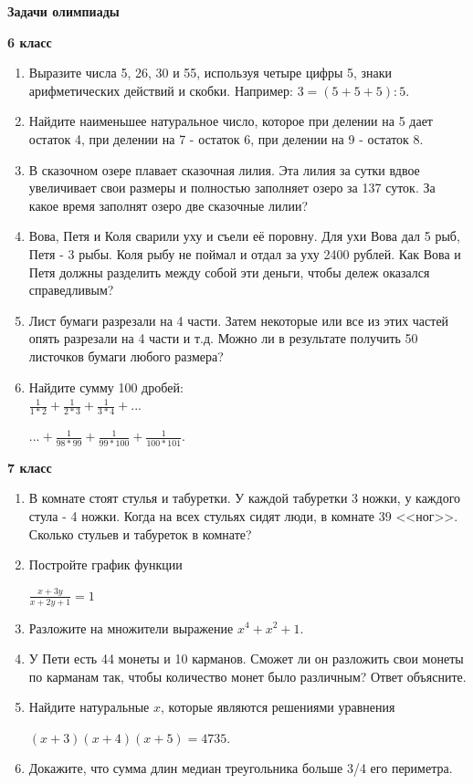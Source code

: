 \documentclass[a4paper,9pt]{article}
\begin{document}
\begin{center}
    {\LARGE \textbf{Задачи олимпиады}}
\end{center}

\begin{multicols}{3}

\textbf{6 класс}

\begin{enumerate}
    \item Выразите числа 5, 26, 30 и 55, используя четыре цифры 5, знаки арифметических действий и скобки. Например: \(3=(5+5+5):5\).
    \item Найдите наименьшее натуральное число, которое при делении на 5 дает остаток 4, при делении на 7 - остаток 6, при делении на 9 - остаток 8.
    \item В сказочном озере плавает сказочная лилия. Эта лилия за сутки вдвое увеличивает свои размеры и полностью заполняет озеро за 137 суток. За какое время заполнят озеро две сказочные лилии?
    \item Вова, Петя и Коля сварили уху и съели её поровну. Для ухи Вова дал 5 рыб, Петя - 3 рыбы. Коля рыбу не поймал и отдал за уху 2400 рублей. Как Вова и Петя должны разделить между собой эти деньги, чтобы дележ оказался справедливым?
    \item Лист бумаги разрезали на 4 части. Затем некоторые или все из этих частей опять разрезали на 4 части и т.д. Можно ли в результате получить 50 листочков бумаги любого размера?
    \item Найдите сумму 100 дробей: \\[0.5em]
    \(\frac{1}{1*2}+\frac{1}{2*3}+\frac{1}{3*4}+...\)
    \begin{center}
        \(...+\frac{1}{98*99}+\frac{1}{99*100}+\frac{1}{100*101}\).
    \end{center}
\end{enumerate}

\textbf{7 класс}

\begin{enumerate}
    \item В комнате стоят стулья и табуретки. У каждой табуретки 3 ножки, у каждого стула - 4 ножки. Когда на всех стульях сидят люди, в комнате 39 <<ног>>. Сколько стульев и табуреток в комнате?
    \item Постройте график функции
    \begin{center}
        \(\frac{x+3y}{x+2y+1}=1\)
    \end{center}
    \item Разложите на множители выражение \(x^4+x^2+1\).
    \item У Пети есть 44 монеты и 10 карманов. Сможет ли он разложить свои монеты по карманам так, чтобы количество монет было различным? Ответ объясните.
    \item Найдите натуральные \(x\), которые являются решениями уравнения
    \begin{center}
        \((x+3)(x+4)(x+5)=4735\).
    \end{center}
    \item Докажите, что сумма длин медиан треугольника больше 3/4 его периметра.
\end{enumerate}


\end{multicols}
\end{document}
